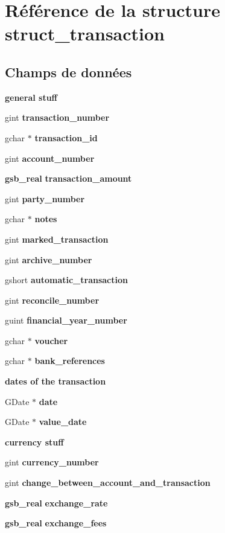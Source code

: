 \section{Référence de la structure struct\_\-transaction}
\label{structstruct__transaction}
\subsection*{Champs de données}
\begin{Indent}{\bf general stuff}\par
{\em \label{_amgrp52b07cac44d92ce9f787d506234f1ad4}
 }\begin{DoxyCompactItemize}
\item 
gint {\bf transaction\_\-number}
\item 
gchar $\ast$ {\bf transaction\_\-id}
\item 
gint {\bf account\_\-number}
\item 
{\bf gsb\_\-real} {\bf transaction\_\-amount}
\item 
gint {\bf party\_\-number}
\item 
gchar $\ast$ {\bf notes}
\item 
gint {\bf marked\_\-transaction}
\item 
gint {\bf archive\_\-number}
\item 
gshort {\bf automatic\_\-transaction}
\item 
gint {\bf reconcile\_\-number}
\item 
guint {\bf financial\_\-year\_\-number}
\item 
gchar $\ast$ {\bf voucher}
\item 
gchar $\ast$ {\bf bank\_\-references}
\end{DoxyCompactItemize}
\end{Indent}
\begin{Indent}{\bf dates of the transaction}\par
{\em \label{_amgrpe5c8cd1770cd43720d123aeb9e80ba77}
 }\begin{DoxyCompactItemize}
\item 
GDate $\ast$ {\bf date}
\item 
GDate $\ast$ {\bf value\_\-date}
\end{DoxyCompactItemize}
\end{Indent}
\begin{Indent}{\bf currency stuff}\par
{\em \label{_amgrp75d2746ebe83b73f13346d6244b4075d}
 }\begin{DoxyCompactItemize}
\item 
gint {\bf currency\_\-number}
\item 
gint {\bf change\_\-between\_\-account\_\-and\_\-transaction}
\item 
{\bf gsb\_\-real} {\bf exchange\_\-rate}
\item 
{\bf gsb\_\-real} {\bf exchange\_\-fees}
\end{DoxyCompactItemize}
\end{Indent}
